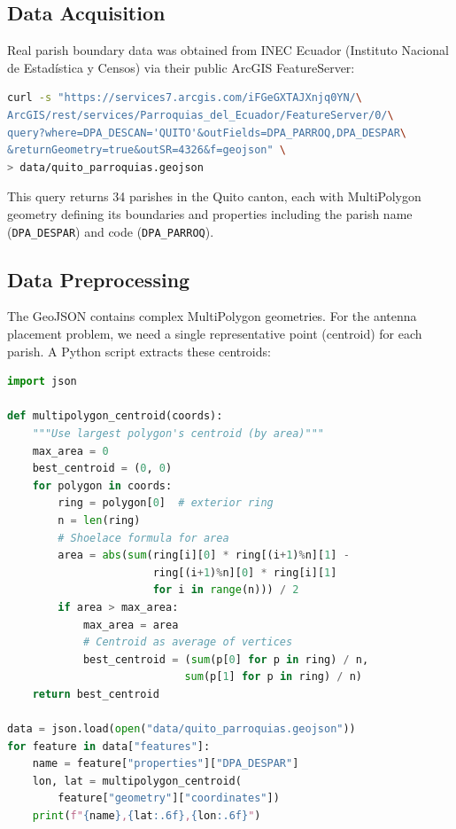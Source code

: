 \documentclass[11pt,a4paper]{article}
\begin{document}
\subsection{Data Acquisition}

Real parish boundary data was obtained from INEC Ecuador (Instituto Nacional de Estadística y Censos) via their public ArcGIS FeatureServer:

\begin{lstlisting}[language=bash,caption={Fetching GeoJSON data from INEC Ecuador}]
curl -s "https://services7.arcgis.com/iFGeGXTAJXnjq0YN/\
ArcGIS/rest/services/Parroquias_del_Ecuador/FeatureServer/0/\
query?where=DPA_DESCAN='QUITO'&outFields=DPA_PARROQ,DPA_DESPAR\
&returnGeometry=true&outSR=4326&f=geojson" \
> data/quito_parroquias.geojson
\end{lstlisting}

This query returns 34 parishes in the Quito canton, each with MultiPolygon geometry defining its boundaries and properties including the parish name (\texttt{DPA\_DESPAR}) and code (\texttt{DPA\_PARROQ}).

\subsection{Data Preprocessing}

The GeoJSON contains complex MultiPolygon geometries. For the antenna placement problem, we need a single representative point (centroid) for each parish. A Python script extracts these centroids:

\begin{lstlisting}[language=Python,caption={Centroid extraction from GeoJSON}]
import json

def multipolygon_centroid(coords):
    """Use largest polygon's centroid (by area)"""
    max_area = 0
    best_centroid = (0, 0)
    for polygon in coords:
        ring = polygon[0]  # exterior ring
        n = len(ring)
        # Shoelace formula for area
        area = abs(sum(ring[i][0] * ring[(i+1)%n][1] -
                       ring[(i+1)%n][0] * ring[i][1]
                       for i in range(n))) / 2
        if area > max_area:
            max_area = area
            # Centroid as average of vertices
            best_centroid = (sum(p[0] for p in ring) / n,
                            sum(p[1] for p in ring) / n)
    return best_centroid

data = json.load(open("data/quito_parroquias.geojson"))
for feature in data["features"]:
    name = feature["properties"]["DPA_DESPAR"]
    lon, lat = multipolygon_centroid(
        feature["geometry"]["coordinates"])
    print(f"{name},{lat:.6f},{lon:.6f}")
\end{lstlisting}
\end{document}
